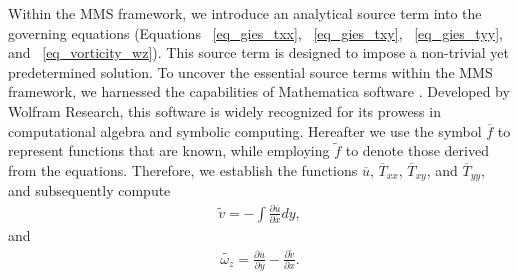 \documentclass[preprint, 12pt]{elsarticle}
\begin{document}
Within the MMS framework, we introduce an analytical source term into the governing equations (Equations ~\eqref{eq_gies_txx}, ~\eqref{eq_gies_txy}, ~\eqref{eq_gies_tyy}, and ~\eqref{eq_vorticity_wz}). This source term is designed to impose a non-trivial yet predetermined solution. To uncover the essential source terms within the MMS framework, we harnessed the capabilities of Mathematica software \cite{Mathematica}. Developed by Wolfram Research, this software is widely recognized for its prowess in computational algebra and symbolic computing. Hereafter we use the symbol $\overline{f}$ to represent functions that are known, while employing $\widetilde{f}$ to denote those derived from the equations. Therefore, we establish the functions $\overline{u}$, $\overline{T}_{xx}$, $\overline{T}_{xy}$, and $\overline{T}_{yy}$, and subsequently compute
\begin{gather}
    \widetilde{v} = - \int \frac{\partial \overline{u}}{\partial x}dy,\label{MMS_v_linha}
\end{gather}
and
\begin{gather}
    \widetilde{\omega_z}=\frac{\partial \overline{u}}{\partial y}-\frac{\partial \widetilde{v}}{\partial x}.\label{vortic_corrent_uv_linha}
\end{gather}
\end{document}

